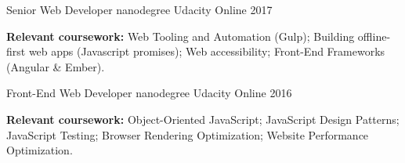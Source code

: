 \clearpage



\begin{cventries}


\cventry
{Senior Web Developer nanodegree} %
{Udacity} %
{Online} %
{2017} %
{ %
	\begin{cvitems}
		\textbf{Relevant coursework:} \newline
		Web Tooling and Automation (Gulp); Building offline-first web apps (Javascript promises); Web accessibility; Front-End Frameworks (Angular \& Ember).
	\end{cvitems}
}




\cventry
{Front-End Web Developer nanodegree} %
{Udacity} %
{Online} %
{2016} %
{ %
\begin{cvitems}
	\textbf{Relevant coursework:} \newline
	Object-Oriented JavaScript; JavaScript Design Patterns; JavaScript Testing; Browser Rendering Optimization; Website Performance Optimization.
\end{cvitems}
}


\end{cventries}